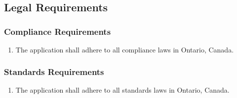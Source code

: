 \documentclass[12pt, titlepage]{article}
\begin{document}

\subsection{Legal Requirements}
\label{sub:legal_requirements}

\subsubsection{Compliance Requirements}
\label{ssub:compliance_requirements}
\begin{enumerate}[{LR}1. ]
	\item The application shall adhere to all compliance laws in Ontario, Canada.
\end{enumerate}

\subsubsection{Standards Requirements}
\label{ssub:standards_requirements}
\begin{enumerate}[{LR}1. ]
	\item The application shall adhere to all standards laws in Ontario, Canada.
\end{enumerate}


\end{document}
